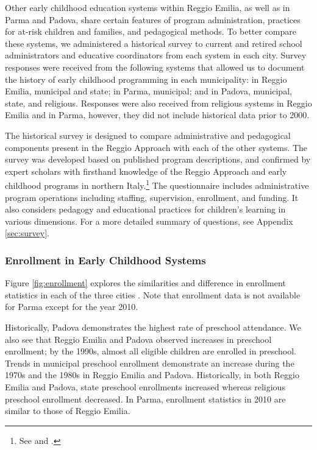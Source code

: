 Other early childhood education systems within Reggio Emilia, as well as in Parma and Padova, share certain features of program administration, practices for at-risk children and families, and pedagogical methods. To better compare these systems, we administered a historical survey to current and retired school administrators and educative coordinators from each system in each city. Survey responses were received from the following systems that allowed us to document the history of early childhood programming in each municipality: in Reggio Emilia, municipal and state; in Parma, municipal; and in Padova, municipal, state, and religious. Responses were also received from religious systems in Reggio Emilia and in Parma, however, they did not include historical data prior to 2000. 

The historical survey is designed to compare administrative and pedagogical components present in the Reggio Approach with each of the other systems. The survey was developed based on published program descriptions, and confirmed by expert scholars with firsthand knowledge of the Reggio Approach and early childhood programs in northern Italy.\footnote{See \citet{Edwards-etal-eds_1998_Hundred-Languages} and \citet{Corsaro_2008_Policy-Practice}.} The questionnaire includes administrative program operations including staffing, supervision, enrollment, and funding. It also considers pedagogy and educational practices for children's learning in various dimensions. For a more detailed summary of questions, see Appendix \ref{sec:survey}.

\subsubsection{Enrollment in Early Childhood Systems}

Figure \ref{fig:enrollment} explores the similarities and difference in enrollment statistics in each of the three cities \citep{Padova-Admin-Data_1964-2011,Reggio-Admin-data_1966-2006,Reggio-Annual-Journals_1994-2011}. Note that enrollment data is not available for Parma except for the year 2010. 

Historically, Padova demonstrates the highest rate of preschool attendance. We also see that Reggio Emilia and Padova observed increases in preschool enrollment; by the 1990s, almost all eligible children are enrolled in preschool. Trends in municipal preschool enrollment demonstrate an increase during the 1970s and the 1980s in Reggio Emilia and Padova. Historically, in both Reggio Emilia and Padova, state preschool enrollments increased whereas religious preschool enrollment decreased. In Parma, enrollment statistics in 2010 are similar to those of Reggio Emilia. 

